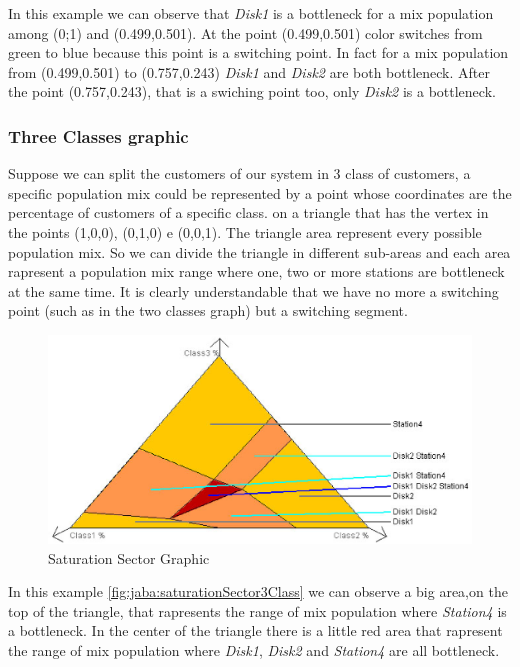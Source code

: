 In this example we can observe that \emph{Disk1} is a bottleneck for a mix population
among (0;1) and (0.499,0.501). At the point (0.499,0.501) color switches from green to blue because
this point is a switching point. In fact for a mix population from (0.499,0.501) to (0.757,0.243)
\emph{Disk1} and \emph{Disk2} are both bottleneck. After the point (0.757,0.243), that is a swiching
point too, only \emph{Disk2} is a bottleneck.


\subsubsection{Three Classes graphic}

Suppose we can split the customers of our system in 3 class of customers, a specific population mix could be represented by a point whose coordinates are the percentage of customers of a specific class.
on a triangle that has the vertex in the points (1,0,0), (0,1,0) e (0,0,1). The triangle area represent every possible population mix. So we can divide the triangle in different sub-areas and each area
rapresent a population mix range where one, two or more stations are bottleneck at the same time.
It is clearly understandable that we have no more a switching point (such as in the two classes graph)
but a switching segment.
\begin{figure}[htbp]
    \begin{center}
        \includegraphics[scale=.5]{img/jaba/saturationSector3Class}
    \end{center}
    \caption{Saturation Sector Graphic}
    \label{fig:jaba:saturationSector3Class}
\end{figure}

In this example \autoref{fig:jaba:saturationSector3Class} we can observe a big area,on the top of the triangle, that rapresents the range of mix population where \emph{Station4} is a bottleneck. In the center of the triangle there is a little red area that rapresent the range of mix population where \emph{Disk1}, \emph{Disk2} and \emph{Station4} are all bottleneck.

